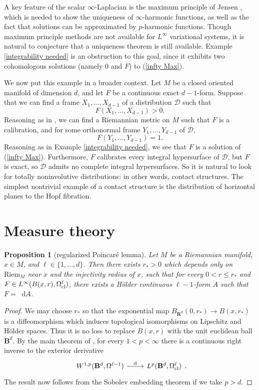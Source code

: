 \documentclass[reqno,11pt]{amsart}
\newcommand{\RR}{\mathbf{R}}
\newcommand{\Ball}{\mathbf{B}}
\newcommand*\dif{\mathop{}\!\mathrm{d}}
\newcommand{\Riem}{\mathrm{Riem}}
\newtheorem{proposition}[theorem]{Proposition}
\theoremstyle{definition}
\numberwithin{equation}{section}
\begin{document}
A key feature of the scalar $\infty$-Laplacian is the maximum principle of Jensen \cite{Jensen1993}, which is needed to show the uniqueness of $\infty$-harmonic functions, as well as the fact that solutions can be approximated by $p$-harmonic functions.
Though maximum principle methods are not available for $L^\infty$ variational systems, it is natural to conjecture that a uniqueness theorem is still available.
Example \ref{integrability needed} is an obstruction to this goal, since it exhibits two cohomologous solutions (namely $0$ and $F$) to (\ref{infty Max}).

We now put this example in a broader context.
Let $M$ be a closed oriented manifold of dimension $d$, and let $F$ be a continuous exact $d - 1$-form. 
Suppose that we can find a frame $X_1, \dots, X_{d - 1}$ of a distribution $\mathscr D$ such that
$$F(X_1, \dots, X_{d - 1}) > 0.$$
Reasoning as in \cite[\S4]{bangert_cui_2017}, we can find a Riemannian metric on $M$ such that $F$ is a calibration, and for some orthonormal frame $Y_1, \dots, Y_{d - 1}$ of $\mathscr D$, 
$$F(Y_1, \dots, Y_{d - 1}) = 1.$$
Reasoning as in Example \ref{integrability needed}, we see that $F$ is a solution of (\ref{infty Max}).
Furthermore, $F$ calibrates every integral hypersurface of $\mathscr D$, but $F$ is exact, so $\mathscr D$ admits no complete integral hypersurfaces.
So it is natural to look for totally noninvolutive distributions: in other words, contact structures.
The simplest nontrivial example of a contact structure is the distribution of horizontal planes to the Hopf fibration.

\appendix
\section{Measure theory}\label{GMT appendix}
\begin{proposition}[regularized Poincar\'e lemma]\label{Hodge theorem}
Let $M$ be a Riemannian manifold, $x \in M$, and $\ell \in \{1, \dots, d\}$.
Then there exists $r_* > 0$ which depends only on $\Riem_M$ near $x$ and the injectivity radius of $x$, such that for every $0 < r \leq r_*$ and $F \in L^\infty(B(x, r), \Omega^\ell_{\rm cl})$, there exists a H\"older continuous $\ell - 1$-form $A$ such that $F = \dif A$.
\end{proposition}
\begin{proof}
We may choose $r_*$ so that the exponential map $B_{\RR^d}(0, r_*) \to B(x, r_*)$ is a diffeomorphism which induces topological isomorphisms on Lipschitz and H\"older spaces.
Thus it is no loss to replace $B(x, r)$ with the unit euclidean ball $\Ball^d$.
By the main theorem of \cite{Costabel2010}, for every $1 < p < \infty$ there is a continuous right inverse to the exterior derivative
\[\begin{tikzcd}
	{W^{1, p}(\Ball^d, \Omega^{\ell - 1})} & {L^p(\Ball^d, \Omega^\ell_{\rm cl})}
	\arrow["{\mathrm d}", from=1-1, to=1-2]
\end{tikzcd}.\]
The result now follows from the Sobolev embedding theorem if we take $p > d$.
\end{proof}
\end{document}
